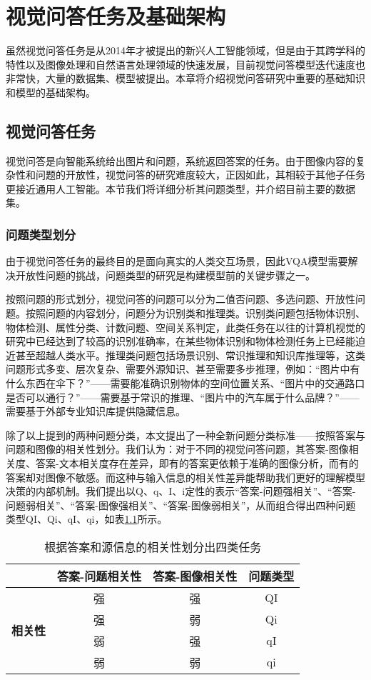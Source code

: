 \chapter{视觉问答任务及基础架构}
虽然视觉问答任务是从2014年才被提出的新兴人工智能领域，但是由于其跨学科的特性以及图像处理和自然语言处理领域的快速发展，目前视觉问答模型迭代速度也非常快，大量的数据集、模型被提出。本章将介绍视觉问答研究中重要的基础知识和模型的基础架构。

\section{视觉问答任务}
视觉问答是向智能系统给出图片和问题，系统返回答案的任务。由于图像内容的复杂性和问题的开放性，视觉问答的研究难度较大，正因如此，其相较于其他子任务更接近通用人工智能。本节我们将详细分析其问题类型，并介绍目前主要的数据集。
\subsection{问题类型划分}
由于视觉问答任务的最终目的是面向真实的人类交互场景，因此VQA模型需要解决开放性问题的挑战，问题类型的研究是构建模型前的关键步骤之一。

按照问题的形式划分，视觉问答的问题可以分为二值否问题、多选问题、开放性问题。按照问题的内容划分，问题分为识别类和推理类。识别类问题包括物体识别、物体检测、属性分类、计数问题、空间关系判定，此类任务在以往的计算机视觉的研究中已经达到了较高的识别准确率，在某些物体识别和物体检测任务上已经能迫近甚至超越人类水平。推理类问题包括场景识别、常识推理和知识库推理等，这类问题形式多变、层次复杂、需要外源知识、甚至需要多步推理，例如：“图片中有什么东西在伞下？”——需要能准确识别物体的空间位置关系、“图片中的交通路口是否可以通行？”——需要基于常识的推理、“图片中的汽车属于什么品牌？”——需要基于外部专业知识库提供隐藏信息。

除了以上提到的两种问题分类，本文提出了一种全新问题分类标准——按照答案与问题和图像的相关性划分。我们认为：对于不同的视觉问答问题，其答案-图像相关度、答案-文本相关度存在差异，即有的答案更依赖于准确的图像分析，而有的答案却对图像不敏感。而这种与输入信息的相关性差异能帮助我们更好的理解模型决策的内部机制。我们提出以Q、q、I、i定性的表示“答案-问题强相关”、“答案-问题弱相关”、“答案-图像强相关”、“答案-图像弱相关”，从而组合得出四种问题类型QI、Qi、qI、qi，如表\ref{ques_type}所示。
\begin{table}[H]
\centering
\caption{根据答案和源信息的相关性划分出四类任务}
\begin{tabular*}{0.9\textwidth}{@{\extracolsep{\fill}}lccc}
\toprule
& \textbf{答案-问题相关性} & \textbf{答案-图像相关性} & \textbf{问题类型} \\
\midrule
\multirow{4}{*}{\textbf{相关性}} &  强& 强&  QI\\
&  强& 弱&  Qi\\
&  弱& 强&  qI\\
&  弱& 弱&  qi\\
\bottomrule
\end{tabular*}
\label{ques_type}
\end{table}

